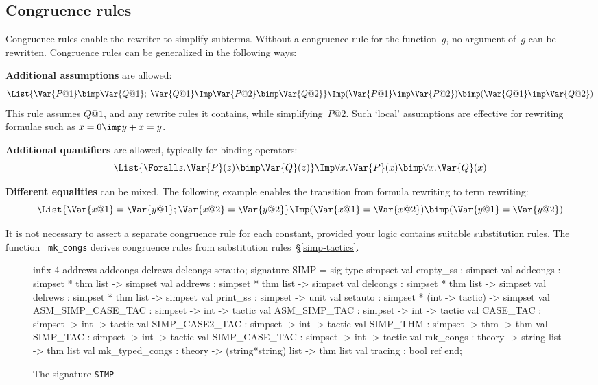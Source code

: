 \subsection{Congruence rules}
Congruence rules enable the rewriter to simplify subterms.  Without a
congruence rule for the function~$g$, no argument of~$g$ can be rewritten.
Congruence rules can be generalized in the following ways:

{\bf Additional assumptions} are allowed:
\[ \List{\Var{P@1} \bimp \Var{Q@1};\; \Var{Q@1} \Imp \Var{P@2} \bimp \Var{Q@2}}
   \Imp (\Var{P@1} \imp \Var{P@2}) \bimp (\Var{Q@1} \imp \Var{Q@2})
\]
This rule assumes $Q@1$, and any rewrite rules it contains, while
simplifying~$P@2$.  Such `local' assumptions are effective for rewriting
formulae such as $x=0\imp y+x=y$.

{\bf Additional quantifiers} are allowed, typically for binding operators:
\[ \List{\Forall z. \Var{P}(z) \bimp \Var{Q}(z)} \Imp
   \forall x.\Var{P}(x) \bimp \forall x.\Var{Q}(x)
\]

{\bf Different equalities} can be mixed.  The following example
enables the transition from formula rewriting to term rewriting:
\[ \List{\Var{x@1}=\Var{y@1};\Var{x@2}=\Var{y@2}} \Imp
   (\Var{x@1}=\Var{x@2}) \bimp (\Var{y@1}=\Var{y@2})
\]
\begin{warn}
It is not necessary to assert a separate congruence rule for each constant,
provided your logic contains suitable substitution rules. The function {\tt
mk_congs} derives congruence rules from substitution
rules~\S\ref{simp-tactics}.
\end{warn}


\begin{figure}
\begin{ttbox}
infix 4 addrews addcongs delrews delcongs setauto;
signature SIMP =
sig
  type simpset
  val empty_ss  : simpset
  val addcongs  : simpset * thm list -> simpset
  val addrews   : simpset * thm list -> simpset
  val delcongs  : simpset * thm list -> simpset
  val delrews   : simpset * thm list -> simpset
  val print_ss  : simpset -> unit
  val setauto   : simpset * (int -> tactic) -> simpset
  val ASM_SIMP_CASE_TAC : simpset -> int -> tactic
  val ASM_SIMP_TAC      : simpset -> int -> tactic
  val CASE_TAC          : simpset -> int -> tactic
  val SIMP_CASE2_TAC    : simpset -> int -> tactic
  val SIMP_THM          : simpset -> thm -> thm
  val SIMP_TAC          : simpset -> int -> tactic
  val SIMP_CASE_TAC     : simpset -> int -> tactic
  val mk_congs          : theory -> string list -> thm list
  val mk_typed_congs    : theory -> (string*string) list -> thm list
  val tracing   : bool ref
end;
\end{ttbox}
\caption{The signature {\tt SIMP}} \label{SIMP}
\end{figure}


